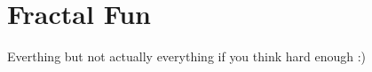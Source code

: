 \recalctypearea
\section{Fractal Fun}
\begin{topics}
Everthing but not actually everything if you think hard enough :)
\end{topics}

